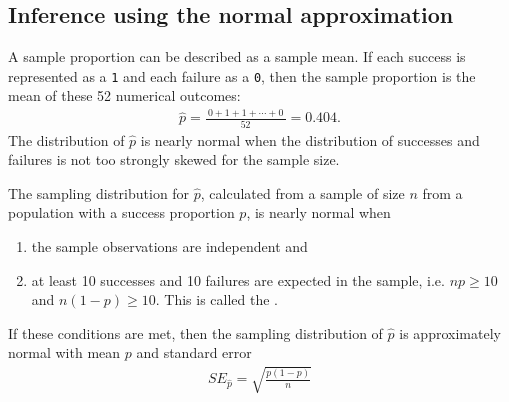 \subsection{Inference using the normal approximation}

A sample proportion can be described as a sample mean. If each success  is represented as a \texttt{1} and each failure as a \texttt{0}, then the sample proportion is the mean of these 52 numerical outcomes:
\begin{eqnarray*}
\hat{p} = \frac{\ 0 + 1 + 1 + \cdots + 0\ }{52} = 0.404.
\end{eqnarray*}
The distribution of $\hat{p}$ is nearly normal when the distribution of successes and failures is not too strongly skewed for the sample size.

\begin{termBox}{
The sampling distribution for $\hat{p}$, calculated from a sample of size $n$ from a population with a success proportion $p$, is nearly normal when
\begin{enumerate}
\item the sample observations are independent and
\item at least 10 successes and 10 failures are expected in the sample, i.e. $np\geq10$ and $n(1-p)\geq10$. This is called the .
\end{enumerate}

If these conditions are met, then the sampling distribution of $\hat{p}$ is approximately normal with mean $p$ and standard error
\begin{eqnarray}
SE_{\hat{p}} = \sqrt{\frac{p(1-p)}{n}}
\label{seOfPHat}
\end{eqnarray}}
\end{termBox}

